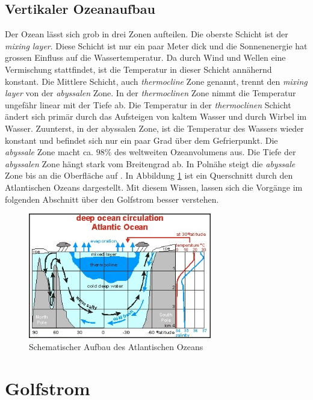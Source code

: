 \subsection{Vertikaler Ozeanaufbau}\label{thermohalin:vertikal}
Der Ozean lässt sich grob in drei Zonen aufteilen. Die oberste Schicht ist der {\em mixing layer}. Diese Schicht ist nur ein paar Meter dick und die Sonnenenergie hat grossen Einfluss auf die Wassertemperatur. Da durch Wind und Wellen eine Vermischung stattfindet, ist die Temperatur in dieser Schicht annähernd konstant. Die Mittlere Schicht, auch {\em thermocline} Zone genannt, trennt den {\em mixing layer} von der {\em abyssalen} Zone. In der {\em thermoclinen} Zone nimmt die Temperatur ungefähr linear mit der Tiefe ab. Die Temperatur in der {\em thermoclinen} Schicht ändert sich primär durch das Aufsteigen von kaltem Wasser und durch Wirbel im Wasser. Zuunterst, in der abyssalen Zone, ist die Temperatur des Wassers wieder konstant und befindet sich nur ein paar Grad über dem Gefrierpunkt. Die {\em abyssale} Zone macht ca. $98\%$ des weltweiten Ozeanvolumens aus. Die Tiefe der {\em abyssalen} Zone hängt stark vom Breitengrad ab. In Polnähe steigt die {\em abyssale} Zone bis an die Oberfläche auf \cite{skript:kaperengler}. In Abbildung \ref{thermohalin:deep-ocean-circulation} ist ein Querschnitt durch den Atlantischen Ozeans dargestellt. Mit diesem Wissen, lassen sich die Vorgänge im folgenden Abschnitt über den Golfstrom besser verstehen.
%
%
%

\begin{figure}
	\includegraphics[width=8cm]{thermohalin/Bilder/deep_ocean_circulation.jpg}
	\centering
	\caption{Schematischer Aufbau des Atlantischen Ozeans \cite{skript:kaperengler} \label{thermohalin:deep-ocean-circulation}}
\end{figure}


\section{Golfstrom}

